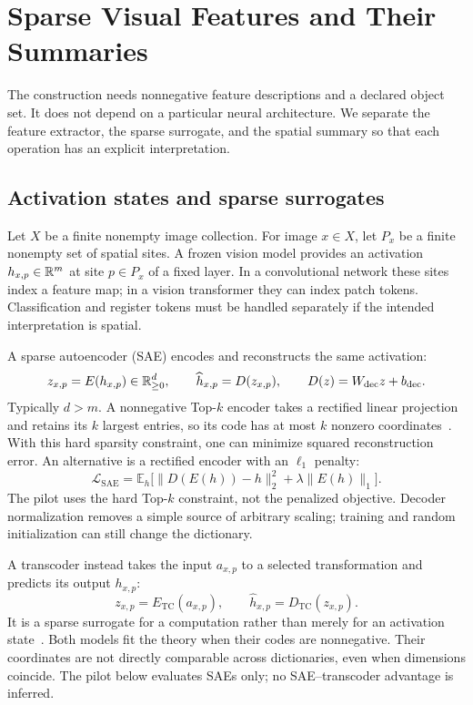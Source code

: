 \section{Sparse Visual Features and Their Summaries}
\label{sec:surrogates}
The construction needs nonnegative feature descriptions and a declared
object set. It does not depend on a particular neural architecture.
We separate the feature extractor, the sparse surrogate, and the spatial
summary so that each operation has an explicit interpretation.

\subsection{Activation states and sparse surrogates}
\label{sub:activation-states}
Let $X$ be a finite nonempty image collection. For image $x\in X$, let
$P_{x}$ be a finite nonempty set of spatial sites. A frozen vision model
provides an activation $h_{x,p}\in\mathbb{R}^{m}$ at site $p\in P_{x}$ of a fixed
layer. In a convolutional network these sites index a feature map; in a
vision transformer they can index patch tokens. Classification and
register tokens must be handled separately if the intended interpretation
is spatial.

A sparse autoencoder (SAE) encodes and reconstructs the same activation:
\begin{equation}\label{eq:sae}
  z_{x,p}=E(h_{x,p})\in\mathbb{R}_{\geq 0}^{d},\qquad
  \widehat h_{x,p}=D(z_{x,p}),\qquad
  D(z)=W_{\mathrm{dec}}z+b_{\mathrm{dec}}.
\end{equation}
Typically $d>m$. A nonnegative Top-$k$ encoder takes a rectified linear
projection and retains its $k$ largest entries, so its code has at most
$k$ nonzero coordinates~\cite{gao2024}. With this hard sparsity constraint,
one can minimize squared reconstruction error. An alternative is a
rectified encoder with an $\ell_{1}$ penalty:
\begin{equation}\label{eq:sae-loss}
  \mathcal{L}_{\mathrm{SAE}}
  =\mathbb{E}_{h}\bigl[
    \|D(E(h))-h\|_{2}^{2}+\lambda\|E(h)\|_{1}\bigr].
\end{equation}
The pilot uses the hard Top-$k$ constraint, not the penalized objective.
Decoder normalization removes a simple source of arbitrary scaling;
training and random initialization can still change the dictionary.

A transcoder instead takes the input $a_{x,p}$ to a selected transformation
and predicts its output $h_{x,p}$:
\begin{equation}\label{eq:transcoder}
  z_{x,p}=E_{\mathrm{TC}}(a_{x,p}),\qquad
  \widehat h_{x,p}=D_{\mathrm{TC}}(z_{x,p}).
\end{equation}
It is a sparse surrogate for a computation rather than merely for an
activation state~\cite{dunefsky2024transcoders}. Both models fit the theory
when their codes are nonnegative. Their coordinates are not directly
comparable across dictionaries, even when dimensions coincide. The pilot
below evaluates SAEs only; no SAE--transcoder advantage is inferred.

